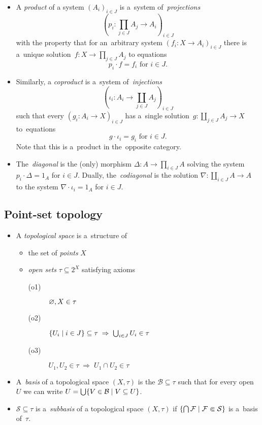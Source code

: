 \begin{itemize}
\item A \emph{product} of a system $\left(A_i\right)_{i\in J}$ is a~system
of~\emph{projections\/}
\[
  \left(p_i\colon \prod_{j\in J} A_j \to A_i \right)_{i\in J}
\]
with the property that for an~arbitrary system $\left(f_i\colon X \to
A_i\right)_{i\in J}$ there is a~unique solution~$f\colon X \to \prod_{j\in
J} A_j$ to equations
\[
  p_i \cdot f = f_i \text{ for } i\in J.
\]

\item Similarly, a \emph{coproduct} is a~system of~\emph{injections\/}
\[
  \left(\iota_i\colon A_i \to \coprod_{j\in J} A_j \right)_{i\in J}
\]
such that every $\left(g_i\colon A_i \to X \right)_{i\in J}$ has a~single
solution~$g\colon \coprod_{j\in J} A_j \to X$ to~equations
\[
  g \cdot \iota_i = g_i \text{ for } i\in J.
\]
Note that this is a~product in the~opposite category.

\item The~\emph{diagonal} is the (only) morphism $\Delta\colon A \to \prod_{i\in
J} A$ solving the system $p_i\cdot \Delta = 1_A$ for $i \in J$.
Dually, the~\emph{codiagonal} is the solution $\nabla\colon \coprod_{i\in J} A
\to A$ to the system $\nabla\cdot \iota_i = 1_A$ for $i \in J$.
\end{itemize}


\subsection*{Point-set topology}

\begin{itemize}
\item A \emph{topological space} is a~structure of
  \begin{itemize}
  \item the set of \emph{points\/} $X$
  \item \emph{open sets\/} $\tau\subseteq 2^X$ satisfying axioms
    \begin{description}
    \item[(o1)] $\varnothing, X \in \tau$
    \item[(o2)] $\left\{ U_i \mid i\in J \right\} \subseteq \tau \; \Rightarrow
    \; \bigcup_{i\in J} U_i \in \tau$
    \item[(o3)] $U_1, U_2 \in \tau \; \Rightarrow \; U_1 \cap U_2 \in \tau$
    \end{description}
  \end{itemize}

\item A~\emph{basis} of a topological space $(X, \tau)$ is the
$\mathcal{B}\subseteq \tau$ such that for every open $U$ we can write $U =
\bigcup \{V\in \mathcal{B} \mid V\subseteq U \}$.

\item $\mathcal{S}\subseteq \tau$ is a~\emph{subbasis} of a
topological space $(X, \tau)$ if $\left\{ \bigcap \mathcal{F} \mid \mathcal{F}
\Subset \mathcal{S} \right\}$ is a~basis of~$\tau$.
\end{itemize}

